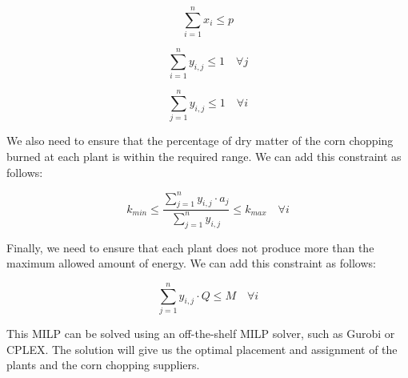\documentclass{article}
\begin{document}
$$\sum_{i=1}^n x_i \leq p$$

$$\sum_{i=1}^n y_{i,j} \leq 1 \quad \forall j$$

$$\sum_{j=1}^n y_{i,j} \leq 1 \quad \forall i$$

We also need to ensure that the percentage of dry matter of the corn chopping burned at each plant is within the required range. We can add this constraint as follows:

$$k_{min} \leq \frac{\sum_{j=1}^n y_{i,j} \cdot a_j}{\sum_{j=1}^n y_{i,j}} \leq k_{max} \quad \forall i$$

Finally, we need to ensure that each plant does not produce more than the maximum allowed amount of energy. We can add this constraint as follows:

$$\sum_{j=1}^n y_{i,j} \cdot Q \leq M \quad \forall i$$

This MILP can be solved using an off-the-shelf MILP solver, such as Gurobi or CPLEX. The solution will give us the optimal placement and assignment of the plants and the corn chopping suppliers.
\end{document}

